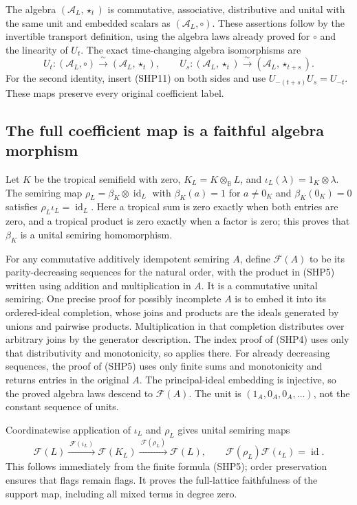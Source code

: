 The algebra $(\mathcal A_L,\star_t)$ is commutative,
associative, distributive and unital with the same unit
and embedded scalars as $(\mathcal A_L,\circ)$.
These assertions follow by the invertible transport
definition, using the algebra laws already proved
for $\circ$ and the linearity of $U_t$.
The exact time-changing algebra isomorphisms are
\begin{equation}\tag{SHP14}
 U_t:(\mathcal A_L,\circ)\xrightarrow{\;\sim\;}
                (\mathcal A_L,\star_t),\qquad
 U_s:(\mathcal A_L,\star_t)\xrightarrow{\;\sim\;}
                (\mathcal A_L,\star_{t+s}).
\end{equation}
For the second identity, insert (SHP11) on both sides
and use $U_{-(t+s)}U_s=U_{-t}$. These maps preserve
every original coefficient label.

\subsection{The full coefficient map is a faithful algebra morphism}

Let $K$ be the tropical semifield with zero,
$K_L=K\otimes_{\mathbb B}L$, and
$\iota_L(\lambda)=1_K\otimes\lambda$.
The semiring map $\rho_L=\beta_K\otimes\operatorname{id}_L$
with $\beta_K(a)=1$ for $a\ne0_K$ and $\beta_K(0_K)=0$
satisfies $\rho_L\iota_L=\operatorname{id}_L$.
Here a tropical sum is zero exactly when both entries
are zero, and a tropical product is zero exactly when
a factor is zero; this proves that $\beta_K$ is a
unital semiring homomorphism.

For any commutative additively idempotent semiring $A$,
define $\mathcal F(A)$ to be its parity-decreasing sequences
for the natural order, with the product in (SHP5) written
using addition and multiplication in $A$.
It is a commutative unital semiring.
One precise proof for possibly incomplete $A$ is to
embed it into its ordered-ideal completion, whose joins
and products are the ideals generated by unions and
pairwise products. Multiplication in that completion
distributes over arbitrary joins by the generator
description. The index proof of (SHP4) uses only that
distributivity and monotonicity, so applies there.
For already decreasing sequences, the proof of (SHP5)
uses only finite sums and monotonicity and returns
entries in the original $A$. The principal-ideal
embedding is injective, so the proved algebra laws
descend to $\mathcal F(A)$.
The unit is $(1_A,0_A,0_A,\ldots)$, not the constant
sequence of units.

Coordinatewise application of $\iota_L$ and $\rho_L$
gives unital semiring maps
\begin{equation}\tag{SHP15}
 \mathcal F(L)\xrightarrow{\ \mathcal F(\iota_L)\ }
 \mathcal F(K_L)\xrightarrow{\ \mathcal F(\rho_L)\ }
 \mathcal F(L),\qquad
 \mathcal F(\rho_L)\mathcal F(\iota_L)
                          =\operatorname{id}.
\end{equation}
This follows immediately from the finite formula (SHP5);
order preservation ensures that flags remain flags.
It proves the full-lattice faithfulness of the support
map, including all mixed terms in degree zero.

